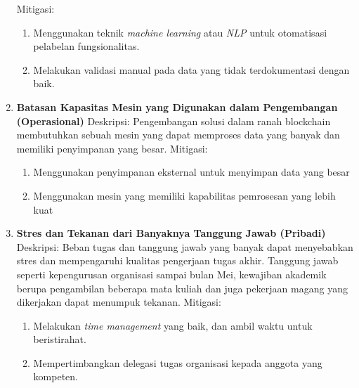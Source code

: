 \begin{enumerate}
	      Mitigasi:
	      \begin{enumerate}
		      \item Menggunakan teknik \textit{machine learning} atau \textit{NLP} untuk otomatisasi pelabelan fungsionalitas.
		      \item Melakukan validasi manual pada data yang tidak terdokumentasi dengan baik.
	      \end{enumerate}
	\item \textbf{Batasan Kapasitas Mesin yang Digunakan dalam Pengembangan (Operasional)} \newline
	      Deskripsi: Pengembangan solusi dalam ranah blockchain membutuhkan sebuah mesin yang dapat memproses data yang banyak dan memiliki penyimpanan yang besar. \newline
	      Mitigasi:
	      \begin{enumerate}
		      \item Menggunakan penyimpanan eksternal untuk menyimpan data yang besar
		      \item Menggunakan mesin yang memiliki kapabilitas pemrosesan yang lebih kuat
	      \end{enumerate}
	\item \textbf{Stres dan Tekanan dari Banyaknya Tanggung Jawab (Pribadi)}  \newline
	      Deskripsi: Beban tugas dan tanggung jawab yang banyak dapat menyebabkan stres dan mempengaruhi kualitas pengerjaan tugas akhir. Tanggung jawab seperti kepengurusan organisasi sampai bulan Mei, kewajiban akademik berupa pengambilan beberapa mata kuliah dan juga pekerjaan magang yang dikerjakan dapat menumpuk tekanan. \newline
	      Mitigasi:
	      \begin{enumerate}
		      \item Melakukan \textit{time management} yang baik, dan ambil waktu untuk beristirahat.
		      \item Mempertimbangkan delegasi tugas organisasi kepada anggota yang kompeten.
	      \end{enumerate}
\end{enumerate}